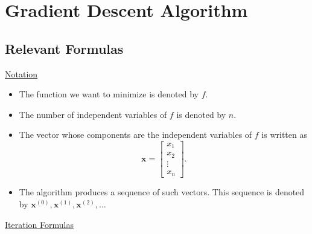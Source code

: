 \documentclass[10pt,american]{scrartcl}
\begin{document}
\section*{Gradient Descent Algorithm}

\subsection*{Relevant Formulas}

\uline{Notation}
\begin{itemize}
\item The function we want to minimize is denoted by $f$.
\item The number of independent variables of $f$ is denoted by $n$.
\item The vector whose components are the independent variables of $f$
is written as
\[
\mathbf{x}=\begin{bmatrix}x_{1}\\
x_{2}\\
\vdots\\
x_{n}
\end{bmatrix}.
\]
\item The algorithm produces a sequence of such vectors. This sequence is
denoted by $\mathbf{x}^{\left(0\right)},\mathbf{x}^{\left(1\right)},\mathbf{x}^{\left(2\right)},\ldots$
\end{itemize}
\uline{Iteration Formulas}
\end{document}
